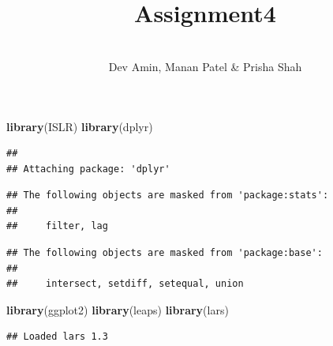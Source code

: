 \documentclass[
]{article}
\title{\\
Assignment4\\}
\author{\strut \\
Dev Amin, Manan Patel \& Prisha Shah\\}
\date{\strut \\
2025-10-08\\}
\newenvironment{Shaded}{\begin{snugshade}}{\end{snugshade}}
\newcommand{\FunctionTok}[1]{\textcolor[rgb]{0.13,0.29,0.53}{\textbf{#1}}}
\newcommand{\NormalTok}[1]{#1}
\begin{document}
\maketitle

\begin{Shaded}
\begin{Highlighting}[]
\FunctionTok{library}\NormalTok{(ISLR)}
\FunctionTok{library}\NormalTok{(dplyr)}
\end{Highlighting}
\end{Shaded}

\begin{verbatim}
## 
## Attaching package: 'dplyr'
\end{verbatim}

\begin{verbatim}
## The following objects are masked from 'package:stats':
## 
##     filter, lag
\end{verbatim}

\begin{verbatim}
## The following objects are masked from 'package:base':
## 
##     intersect, setdiff, setequal, union
\end{verbatim}

\begin{Shaded}
\begin{Highlighting}[]
\FunctionTok{library}\NormalTok{(ggplot2)}
\FunctionTok{library}\NormalTok{(leaps)}
\FunctionTok{library}\NormalTok{(lars)}
\end{Highlighting}
\end{Shaded}

\begin{verbatim}
## Loaded lars 1.3
\end{verbatim}
\end{document}
